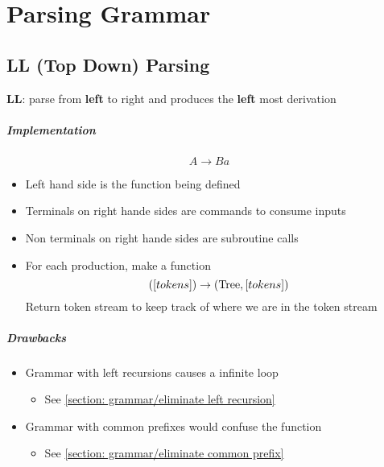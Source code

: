 \chapter{Parsing Grammar}

\section{LL (Top Down) Parsing}

  \begin{definition}
    \textbf{LL}: parse from \textbf{left} to right and produces the
    \textbf{left} most derivation
  \end{definition}

  \paragraph{Implementation}
  \begin{equation*}
    A \to B a
  \end{equation*}
  \begin{itemize}
    \item Left hand side is the function being defined
    \item Terminals on right hande sides are commands to consume inputs
    \item Non terminals on right hande sides are subroutine calls
    \item For each production, make a function
    \begin{equation*}
      \left( \left[ tokens \right] \right) \to
      \left( \operatorname{Tree}, \left[ tokens \right] \right)
    \end{equation*}
    Return token stream to keep track of where we are in the token stream
  \end{itemize}

  \paragraph{Drawbacks}
  \begin{itemize}
    \item Grammar with left recursions causes a infinite loop
    \begin{itemize}
      \item See \ref{section: grammar/eliminate left recursion}
    \end{itemize}
    \item Grammar with common prefixes would confuse the function
    \begin{itemize}
      \item See \ref{section: grammar/eliminate common prefix}
    \end{itemize}
  \end{itemize}
